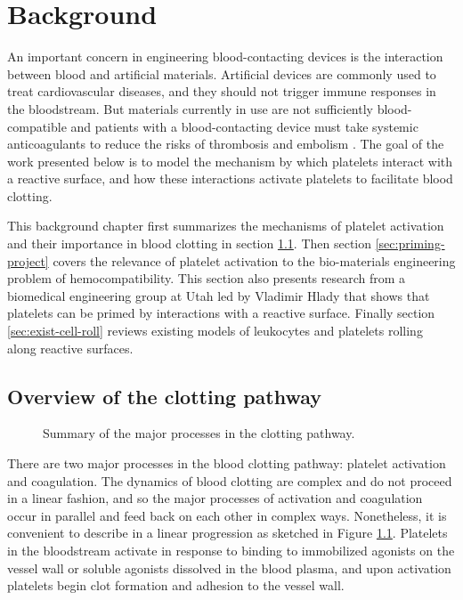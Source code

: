 
\chapter{Background}
\label{cha:background}

An important concern in engineering blood-contacting devices is the
interaction between blood and artificial materials. Artificial devices
are commonly used to treat cardiovascular diseases, and they should
not trigger immune responses in the bloodstream. But materials
currently in use are not sufficiently blood-compatible and patients
with a blood-contacting device must take systemic anti\-coagulants to
reduce the risks of thrombosis and embolism
\cite{Ratner1993,Ratner2007,Oprea13}. The goal of the work presented
below is to model the mechanism by which platelets interact with a
reactive surface, and how these interactions activate platelets to
facilitate blood clotting.

This background chapter first summarizes the mechanisms of platelet
activation and their importance in blood clotting in section
\ref{sec:overview-clotting}. Then section \ref{sec:priming-project}
covers the relevance of platelet activation to the bio-materials
engineering problem of hemocompatibility. This section also presents
research from a biomedical engineering group at Utah led by Vladimir
Hlady that shows that platelets can be primed by interactions with a
reactive surface. Finally section \ref{sec:exist-cell-roll} reviews
existing models of leukocytes and platelets rolling along reactive
surfaces.

\section{Overview of the clotting pathway}
\label{sec:overview-clotting}

\begin{figure}
  \centering
  
  \caption{Summary of the major processes in the clotting pathway.}
  \label{fig:clot-path}
\end{figure}

There are two major processes in the blood clotting pathway: platelet
activation and coagulation. The dynamics of blood clotting are complex
and do not proceed in a linear fashion, and so the major processes of
activation and coagulation occur in parallel and feed back on each
other in complex ways. Nonetheless, it is convenient to describe in a
linear progression as sketched in Figure
\ref{fig:clot-path}. Platelets in the bloodstream activate in response
to binding to immobilized agonists on the vessel wall or soluble
agonists dissolved in the blood plasma, and upon activation platelets
begin clot formation and adhesion to the vessel wall.

